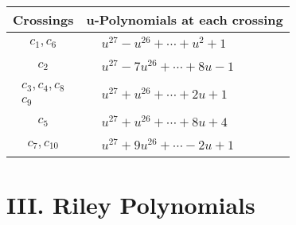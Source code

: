 \documentclass[1p]{elsarticle_modified}
\theoremstyle{definition}
\begin{document}
\begin{tabular}{m{50pt}|m{274pt}}
Crossings & \hspace{64pt}u-Polynomials at each crossing \\
\hline $$\begin{aligned}c_{1},c_{6}\end{aligned}$$&$\begin{aligned}
&u^{27}- u^{26}+\cdots+u^2+1
\end{aligned}$\\
\hline $$\begin{aligned}c_{2}\end{aligned}$$&$\begin{aligned}
&u^{27}-7 u^{26}+\cdots+8 u-1
\end{aligned}$\\
\hline $$\begin{aligned}c_{3},c_{4},c_{8}\\c_{9}\end{aligned}$$&$\begin{aligned}
&u^{27}+u^{26}+\cdots+2 u+1
\end{aligned}$\\
\hline $$\begin{aligned}c_{5}\end{aligned}$$&$\begin{aligned}
&u^{27}+u^{26}+\cdots+8 u+4
\end{aligned}$\\
\hline $$\begin{aligned}c_{7},c_{10}\end{aligned}$$&$\begin{aligned}
&u^{27}+9 u^{26}+\cdots-2 u+1
\end{aligned}$\\
\hline
\end{tabular}\newpage\renewcommand{\arraystretch}{1}
\centering \section*{ III. Riley Polynomials}
\end{document}

